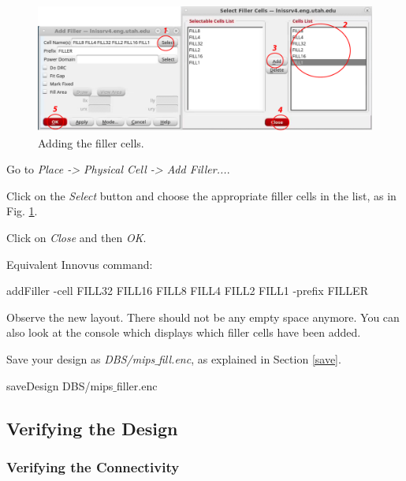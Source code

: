 \begin{enumerate}
	\parbox[t]{\dimexpr\textwidth-\leftmargin}{%
		\begin{figure}
			\vspace{0mm}
			\centering
			\vspace{-\baselineskip}
			\includegraphics[scale=0.36]{figures/lab5_backend/addfiller}
			\caption{Adding the filler cells.}
			\label{fillercells}
		\end{figure}
		\item Go to \textit{Place -> Physical Cell -> Add Filler...}.
		\item Click on the \textit{Select} button and choose the appropriate filler cells in the list, as in Fig. \ref{fillercells}.
		\item Click on \textit{Close} and then \textit{OK}.
	} 

			\vspace{8mm}
			Equivalent Innovus command:
		\begin{codeline}
	addFiller -cell FILL32 FILL16 FILL8 FILL4 FILL2 FILL1 -prefix FILLER
\end{codeline}
		\item Observe the new layout. There should not be any empty space anymore. You can also look at the console which displays which filler cells have been added.
\item Save your design as \textit{DBS/mips$\_$fill.enc}, as explained in Section \ref{save}. 
\begin{codeline}
	saveDesign DBS/mips$\_$filler.enc
\end{codeline}
\end{enumerate}


\subsection{Verifying the Design}
\subsubsection{Verifying the Connectivity}

